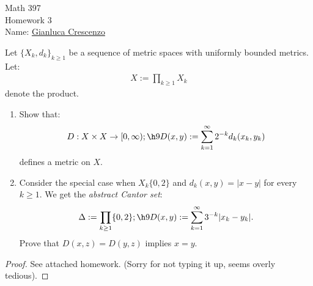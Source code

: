\documentclass[11pt,twoside,openany]{memoir}
\begin{document}
\begin{center}
{\large Math 397 \\[0.1in]Homework 3 \\[0.1in]}
{Name:} {\underline{Gianluca Crescenzo\hspace*{2in}}}\\[0.15in]
\end{center}
\vspace{4pt}
    \addtocounter{exercise}{2}
    \begin{exercise}
        Let $\{X_k,d_k\}_{k \geq 1}$ be a sequence of metric spaces with uniformly bounded metrics. Let:
            \begin{equation*}
            \begin{split}
                X := \prod_{k \geq 1}X_k
            \end{split}
            \end{equation*}
        denote the product.
            \begin{enumerate}[label = (\roman*),itemsep=1pt,topsep=3pt]
                \item Show that:
                    \begin{equation*}
                    \begin{split}
                        D:X \times X \rightarrow [0,\infty); \h9 D(x,y):= \sum_{k = 1}^\infty 2^{-k}d_k(x_k,y_k)
                    \end{split}
                    \end{equation*}
                defines a metric on $X$.

                \item Consider the special case when $X_k \{0,2\}$ and $d_k(x,y) = |x-y|$ for every $k \geq 1$. We get the \textit{abstract Cantor set}:
                    \begin{equation*}
                    \begin{split}
                        \Delta := \prod_{k \geq 1}\{0,2\}; \h9 D(x,y) := \sum_{k = 1}^\infty 3^{-k}|x_k - y_k|.
                    \end{split}
                    \end{equation*}
                Prove that $D(x,z) = D(y,z)$ implies $x = y$.
            \end{enumerate}
    \end{exercise}
        \begin{proof}
            See attached homework. (Sorry for not typing it up, seems overly tedious).
        \end{proof}
\end{document}
